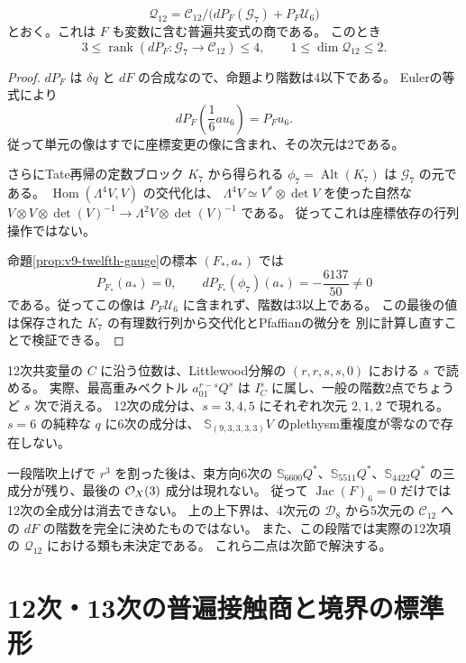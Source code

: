 \begin{corollary}[12次商の厳密な上界と下界]
\label{cor:degree-twelve-contact-bounds}
\[
 \mathcal Q_{12}=
 \mathcal C_{12}/\bigl(dP_F(\mathcal G_7)+P_F\mathcal U_6\bigr)
\]
とおく。これは $F$ も変数に含む普遍共変式の商である。
このとき
\[
 \boxed{
 3\le\operatorname{rank}(dP_F\colon\mathcal G_7\to\mathcal C_{12})\le4,
 \qquad 1\le\dim\mathcal Q_{12}\le2.
 }
\]
\end{corollary}
\begin{proof}
$dP_F$ は $\delta q$ と $dF$ の合成なので、命題より階数は4以下である。
Eulerの等式により
\[
 dP_F\left(\frac16a u_6\right)=P_Fu_6.
\]
従って単元の像はすでに座標変更の像に含まれ、その次元は2である。

さらにTate再帰の定数ブロック $K_7$ から得られる
$\phi_7=\operatorname{Alt}(K_7)$ は $\mathcal G_7$ の元である。
$\operatorname{Hom}(\Lambda^4V,V)$ の交代化は、
$\Lambda^4V\simeq V^*\otimes\det V$ を使った自然な
$V\otimes V\otimes\det(V)^{-1}\to
\Lambda^2V\otimes\det(V)^{-1}$ である。
従ってこれは座標依存の行列操作ではない。

命題\ref{prop:v9-twelfth-gauge}の標本 $(F_*,a_*)$ では
\[
 P_{F_*}(a_*)=0,\qquad
 dP_{F_*}(\phi_7)(a_*)=-\frac{6137}{50}\ne0
\]
である。従ってこの像は $P_F\mathcal U_6$ に含まれず、階数は3以上である。
この最後の値は保存された $K_7$ の有理数行列から交代化とPfaffianの微分を
別に計算し直すことで検証できる。
\end{proof}

\begin{remark}
12次共変量の $C$ に沿う位数は、Littlewood分解の
$(r,r,s,s,0)$ における $s$ で読める。
実際、最高重みベクトル $a_{01}^{r-s}Q^s$ は
$I_C^s$ に属し、一般の階数2点でちょうど $s$ 次で消える。
12次の成分は、$s=3,4,5$ にそれぞれ次元 $2,1,2$ で現れる。
$s=6$ の純粋な $q$ に6次の成分は、
$\mathbb S_{(9,3,3,3,3)}V$ のplethysm重複度が零なので存在しない。

一段階吹上げで $r^3$ を割った後は、束方向6次の
$\mathbb S_{6600}Q^*$、$\mathbb S_{5511}Q^*$、$\mathbb S_{4422}Q^*$
の三成分が残り、最後の $\mathcal O_X(3)$ 成分は現れない。
従って $\operatorname{Jac}(F)_6=0$ だけでは12次の全成分は消去できない。
上の上下界は、4次元の $\mathcal D_8$ から5次元の $\mathcal C_{12}$ への
$dF$ の階数を完全に決めたものではない。
また、この段階では実際の12次項の $\mathcal Q_{12}$ における類も未決定である。
これら二点は次節で解決する。
\end{remark}



\clearpage
\section{12次・13次の普遍接触商と境界の標準形}
\label{sec:contact-twelve-thirteen}

